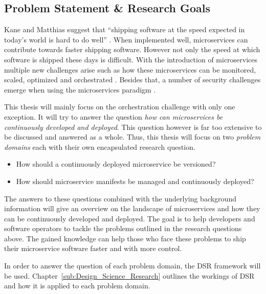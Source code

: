 
\subsection{Problem Statement \& Research Goals}%
\label{sub:Problem_Statement}

Kane and Matthias suggest that \enquote{shipping software at the speed expected
in today's world is hard to do well} \autocite[p.
2]{SeanPKaneDocker&Running2018}. When implemented well, microservices can
contribute towards faster shipping software. However not only the speed at
which software is shipped these days is difficult. With the introduction of
microservices multiple new challenges arise such as how these microservices can
be monitored, scaled, optimized and orchestrated \autocite[p.
67]{TrihinasDevOpsasService2018}. Besides that, a number of security challenges
emerge when using the microservices paradigm
\autocite{YaryginaOvercomingSecurityChallenges2018}.

This thesis will mainly focus on the orchestration challenge with only one
exception. It will try to answer the question \textit{how can microservices be
continuously developed and deployed}. This question however is far too
extensive to be discussed and answered as a whole. Thus, this thesis
will focus on two \textit{problem domains} each with their own encapsulated
research question.

\label{link:problem_domains}
\begin{itemize}
  \item How should a continuously deployed microservice be versioned?
  \item How should microservice manifests be managed and continuously deployed?
\end{itemize}

The answers to these questions combined with the underlying background
information will give an overview on the landscape of microservices and how
they can be continuously developed and deployed. The goal is to help developers
and software operators to tackle the problems outlined in the research
questions above. The gained knowledge can help those who face these problems to
ship their microservice software faster and with more control.

In order to answer the question of each problem domain, the \ac{DSR} framework
will be used. Chapter~\ref{sub:Design_Science_Research} outlines the workings
of \ac{DSR} and how it is applied to each problem domain.
